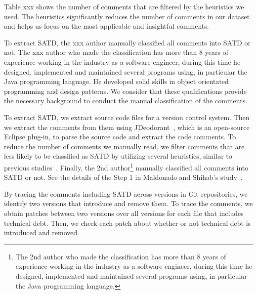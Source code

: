 Table xxx shows the number of comments that are filtered by the heuristics we used. The heuristics significantly reduces the number of comments in our dataset and helps us focus on the most applicable and insightful comments. 


To extract SATD, the xxx author manually classified all comments into SATD or not.
The xxx author who made the classification has more than 8 years of experience working in the industry as a software engineer, during this time he designed, implemented and maintained several programs using, in particular the Java programming language. He developed solid skills in object orientated programming and design patterns. We consider that these qualifications provide the necessary background to conduct the manual classification of the comments.
\fi


To extract SATD, we extract source code files for a version control system. Then we extract the comments from them using JDeodorant~\cite{Tsantalis2008CSMR}, which is an open-source Eclipse plug-in, to parse the source code and extract the code comments.
To reduce the number of comments we manually read, we filter comments that are less likely to be classified as SATD by utilizing several heuristics, similar to previous studies~\cite{Maldonado2015MTD}. Finally, the 2nd author\footnote{The 2nd author who made the classification has more than 8 years of experience working in the industry as a software engineer, during this time he designed, implemented and maintained several programs using, in particular the Java programming language.} manually classified all comments into SATD or not. See the details of the Step 1 in Maldonado and Shihab's study~\cite{Maldonado2015MTD}.


By tracing the comments including SATD across versions in Git repositories, we identify two versions that introduce and remove them. To trace the comments, we obtain patches between two versions over all versions for each file that includes technical debt. Then, we check each patch about whether or not technical debt is introduced and removed. 

